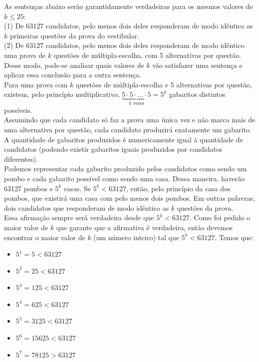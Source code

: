 \documentclass[12pt, a4paper]{article}
\theoremstyle{definition} \newtheorem{prob}{Problema}
\theoremstyle{plain} \newtheorem*{teo}{Teorema}
\begin{document}
As sentenças abaixo serão garantidamente verdadeiras para os mesmos valores de \(k \leq 25\): \\

(1) De \(63127\) candidatos, pelo menos dois deles responderam de modo idêntico as \(k\) primeiras questões da prova do vestibular. \\

(2) De \(63127\) candidatos, pelo menos dois deles responderam de modo idêntico uma prova de \(k\) questões de múltipla-escolha, com 5 alternativas por questão. \\

Desse modo, pode-se analisar quais valores de \(k\) vão satisfazer uma sentença e aplicar essa conclusão para a outra sentença. \\

Para uma prova com \(k\) questões de múltipla-escolha e 5 alternativas por questão,  existem, pelo princípio multiplicativo, \(\underbrace{5\cdot{5}\cdot{\ldots}\cdot{5}}_{k \text{ vezes}} = 5^k\) gabaritos distintos possíveis. \\

Assumindo que cada candidato só faz a prova uma única vez e não marca mais de uma alternativa por questão, cada candidato produzirá exatamente um gabarito. A quantidade de gabaritos produzidos é numericamente igual à quantidade de candidatos (podendo existir gabaritos iguais produzidos por candidatos diferentes). \\

Podemos representar cada gabarito produzido pelos candidatos  como sendo um pombo e cada gabarito possível como sendo uma casa. Dessa maneira, haverão 63127 pombos e \(5^k\) casas. Se \(5^k < 63127\), então, pelo princípio da casa dos pombos, que existirá uma casa com pelo menos dois pombos. Em outras palavras, dois candidatos que responderam de modo idêntico as \(k\) questões da prova. \\

Essa afirmação sempre será verdadeira desde que \(5^k < 63127\). Como foi pedido o maior valor de \(k\) que garante que a afirmativa é verdadeira, então devemos encontrar o maior valor de \(k\) (um número inteiro) tal que \(5^k < 63127\). Temos que: 

\begin{itemize}
\item \(5^1 = 5 < 63127\)

\item \(5^2 = 25 < 63127\)

\item \(5^3 = 125 < 63127\)

\item \(5^4 = 625 < 63127\)

\item \(5^5 = 3125 < 63127\)

\item \(5^6 = 15625 < 63127\)

\item \(5^7 = 78125  > 63127\)
\end{itemize}
\end{document}
